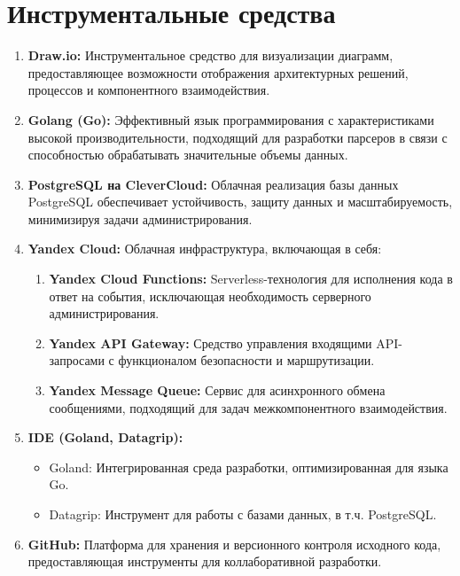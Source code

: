 \section*{Инструментальные средства}

\begin{enumerate}
    \item \textbf{Draw.io:} Инструментальное средство для визуализации диаграмм,
предоставляющее возможности отображения архитектурных решений, процессов и
компонентного взаимодействия.
    \item \textbf{Golang (Go):} Эффективный язык программирования с
характеристиками высокой производительности, подходящий для разработки парсеров
в связи с способностью обрабатывать значительные объемы данных.
    \item \textbf{PostgreSQL на CleverCloud:} Облачная реализация базы данных
PostgreSQL обеспечивает устойчивость, защиту данных и масштабируемость,
минимизируя задачи администрирования.
    \item \textbf{Yandex Cloud:} Облачная инфраструктура, включающая в себя:
    \begin{enumerate}
        \item \textbf{Yandex Cloud Functions:} Serverless-технология для
исполнения кода в ответ на события, исключающая необходимость серверного
администрирования.
        \item \textbf{Yandex API Gateway:} Средство управления входящими
API-запросами с функционалом безопасности и маршрутизации.
        \item \textbf{Yandex Message Queue:} Сервис для асинхронного обмена
сообщениями, подходящий для задач межкомпонентного взаимодействия.
    \end{enumerate}
    \item \textbf{IDE (Goland, Datagrip):} 
    \begin{itemize}
        \item Goland: Интегрированная среда разработки, оптимизированная для
языка Go.
        \item Datagrip: Инструмент для работы с базами данных, в т.ч.
PostgreSQL.
    \end{itemize}
    \item \textbf{GitHub:} Платформа для хранения и версионного контроля
исходного кода, предоставляющая инструменты для коллаборативной разработки.
\end{enumerate}